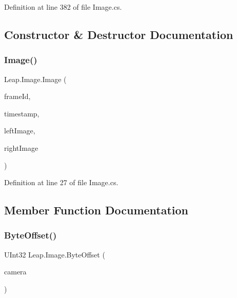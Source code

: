 Definition at line 382 of file Image.\+cs.



\subsection{Constructor \& Destructor Documentation}
\mbox{\label{class_leap_1_1_image_a0a4c011e7107572da7f9c736b50da4a7}} 
\subsubsection{\texorpdfstring{Image()}{Image()}}
{\footnotesize\ttfamily Leap.\+Image.\+Image (\begin{DoxyParamCaption}\item[{Int64}]{frame\+Id,  }\item[{Int64}]{timestamp,  }\item[{\mbox{\hyperlink{class_leap_internal_1_1_image_data}{Image\+Data}}}]{left\+Image,  }\item[{\mbox{\hyperlink{class_leap_internal_1_1_image_data}{Image\+Data}}}]{right\+Image }\end{DoxyParamCaption})}



Definition at line 27 of file Image.\+cs.



\subsection{Member Function Documentation}
\mbox{\label{class_leap_1_1_image_aaab2f799bc4f2f315c26d14401b8a7e7}} 
\subsubsection{\texorpdfstring{ByteOffset()}{ByteOffset()}}
{\footnotesize\ttfamily U\+Int32 Leap.\+Image.\+Byte\+Offset (\begin{DoxyParamCaption}\item[{\mbox{\hyperlink{class_leap_1_1_image_a28310e43e0f2d7f7117e1b45330bdc38}{Camera\+Type}}}]{camera }\end{DoxyParamCaption})}



